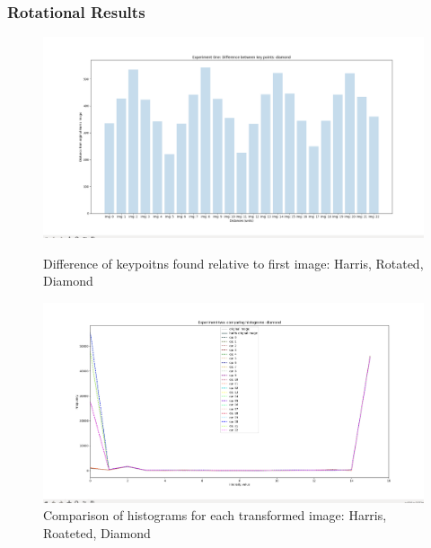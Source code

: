 \documentclass[conference]{IEEEtran}
\begin{document}
\subsubsection{Rotational Results}
\begin{figure}[!htb]
  \centering
  \begin{minipage}[t]{0.45\textwidth}
    \includegraphics[width=\textwidth]{../programme/results/Task_1/rotated_experiements/Harris/diamond/experiement-one-diff-kp-detected.png}
    \caption{Difference of keypoitns found relative to first image: Harris, Rotated, Diamond}
    \label{Difference of keypoitns found relative to first image: Harris, Rotated, Diamond}
  \end{minipage}
  \hfill
  \begin{minipage}[t]{0.45\textwidth}
    \includegraphics[width=\textwidth]{../programme/results/Task_1/rotated_experiements/Harris/diamond/experiment_two_raw_hists.png}
    \caption{Comparison of histograms for each transformed image: Harris, Roateted, Diamond}
    \label{Comparison of histograms for each transformed image: Harris, Roateted, Diamond}
  \end{minipage}
\end{figure}
\end{document}
